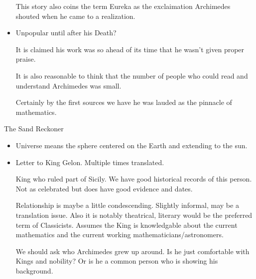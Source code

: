 \documentclass{report}
\begin{document}
\begin{description}
\begin{mdframed}
\begin{itemize}
\begin{mdframed}
                        This story also coins the term Eureka
                        as the exclaimation Archimedes shouted
                        when he came to a realization.
                    \end{mdframed}
                \item Unpopular until after his Death?
                    \begin{mdframed}
                        It is claimed his work was
                        so ahead of its time that he
                        wasn't given proper praise.

                        It is also reasonable to think that
                        the number of people who could read
                        and understand Archimedes was small.

                        Certainly by the first sources we have
                        he was lauded as the pinnacle of
                        mathematics.
                    \end{mdframed}
            \end{itemize}
        \end{mdframed}
        \pagebreak
    \item The Sand Reckoner
        \begin{mdframed}
            \begin{itemize}
                \item Universe means the sphere centered on the
                    Earth and extending to the sun.
                \item Letter to King Gelon. Multiple times
                    translated.
                    \begin{mdframed}
                        King who ruled part of Sicily. We
                        have good historical records of this
                        person. Not as celebrated but does
                        have good evidence and dates.
                    \end{mdframed}
                    \begin{mdframed}
                        Relationship is maybe a little
                        condescending. Slightly informal,
                        may be a translation issue.
                        Also it is notably theatrical, literary
                        would be the preferred term of
                        Classicists. Assumes the King is knowledgable
                        about the current mathematics and the current
                        working mathematicians/astronomers.
                    \end{mdframed}
                    \begin{mdframed}
                        We should ask who Archimedes grew up around.
                        Is he just comfortable with Kings and nobility?
                        Or is he a common person who is showing his
                        background.


\end{mdframed}
\end{itemize}
\end{mdframed}
\end{description}
\end{document}
